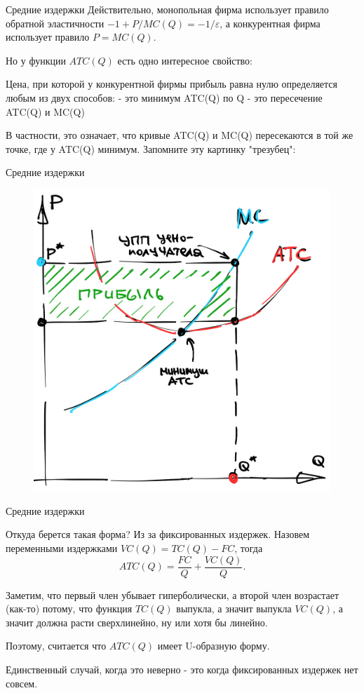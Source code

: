 \documentclass{beamer}
\begin{document}
\begin{frame}{Средние издержки}
Действительно, монопольная фирма использует правило обратной эластичности $-1 + P/MC(Q) = -1/\varepsilon$, а конкурентная фирма использует правило $P = MC(Q)$. 

Но у функции $ATC(Q)$ есть одно интересное свойство:

\begin{lemma}
Цена, при которой у конкурентной фирмы прибыль равна нулю определяется любым из двух способов:
- это минимум ATC(Q) по Q
- это пересечение ATC(Q) и MC(Q)
\end{lemma}
В частности, это означает, что кривые ATC(Q) и MC(Q) пересекаются в той же точке, где у ATC(Q) минимум. Запомните эту картинку "трезубец":
\end{frame}

\begin{frame}{Средние издержки}
\begin{figure}[hbt]
\centering
\includegraphics[width=.7 \textwidth]{trident.png}
\end{figure}
\end{frame}

\begin{frame}{Средние издержки}

Откуда берется такая форма? Из за фиксированных издержек. Назовем переменными издержками $VC(Q) = TC(Q) - FC$, тогда
$$ ATC(Q) = \frac{FC}{Q} + \frac{VC(Q)}{Q}.$$

Заметим, что первый член убывает гиперболически, а второй член возрастает (как-то) потому, что функция $TC(Q)$ выпукла, а значит выпукла $VC(Q)$, а значит должна расти сверхлинейно, ну или хотя бы линейно.

Поэтому, считается что $ATC(Q)$ имеет U-образную форму. 

Единственный случай, когда это неверно - это когда фиксированных издержек нет совсем.

\end{frame}
\end{document}
